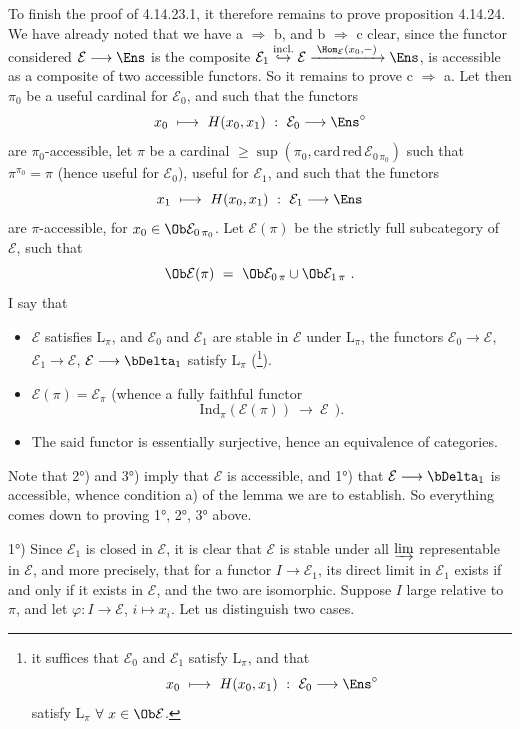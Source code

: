 To finish the proof of 4.14.23.1, it therefore remains to prove proposition 4.14.24. We have already noted that we have a $\Longrightarrow$ b, and b $\Longrightarrow$ c clear, since the functor considered $\mathcal{E}\longrightarrow\Ens$ is the composite $\mathcal{E}_1\overset{\text{incl.}}{\hookrightarrow}\mathcal{E}\xrightarrow{\;\Hom_{\mathcal{E}}(x_0,-)\;}\Ens$, is accessible as a composite of two
accessible functors. So it remains to prove c $\Longrightarrow$ a. Let then $\pi_0$ be a useful cardinal for $\mathcal{E}_0$, and such that the functors
\[
x_0\ \longmapsto\ H(x_0,x_1)\ :\ \mathcal{E}_0\longrightarrow\Ens^{\circ}
\]
are $\pi_0$-accessible, let $\pi$ be a cardinal $\geqslant\sup(\pi_0,\mathrm{card}\,\text{red}\,\mathcal{E}_{0\,\pi_0})$ such that $\pi^{\pi_0}=\pi$ (hence useful for $\mathcal{E}_0$), useful for $\mathcal{E}_1$, and such that the functors
\[
x_1\ \longmapsto\ H(x_0,x_1)\ :\ \mathcal{E}_1\longrightarrow\Ens
\]
are $\pi$-accessible, for $x_0\in\Ob\mathcal{E}_{0\,\pi_0}$. Let $\mathcal{E}(\pi)$ be the strictly full subcategory of $\mathcal{E}$, such that
\[
\Ob\mathcal{E}(\pi)\ =\ \Ob\mathcal{E}_{0\,\pi}\cup\Ob\mathcal{E}_{1\,\pi}\ .
\]
I say that
\begin{itemize}[leftmargin=*]
\item[1°)] $\mathcal{E}$ satisfies $\mathrm{L}_\pi$, and $\mathcal{E}_0$ and $\mathcal{E}_1$ are stable in $\mathcal{E}$ under $\mathrm{L}_\pi$, the functors $\mathcal{E}_0\longrightarrow\mathcal{E}$, $\mathcal{E}_1\longrightarrow\mathcal{E}$, $\mathcal{E}\longrightarrow\bDelta_1$ satisfy $\mathrm{L}_\pi$ (\footnote[174]{it suffices that $\mathcal{E}_0$ and $\mathcal{E}_1$ satisfy $\mathrm{L}_\pi$, and that
\[
x_0\ \longmapsto\ H(x_0,x_1)\ :\ \mathcal{E}_0\longrightarrow\Ens^{\circ}
\]
satisfy $\mathrm{L}_\pi$ $\forall\ x\in\Ob\mathcal{E}$.}).
\item[2°)] $\mathcal{E}(\pi)=\mathcal{E}_\pi$ (whence a fully faithful functor
\[
\mathrm{Ind}_\pi(\mathcal{E}(\pi))\ \longrightarrow\ \mathcal{E}\ \ ).
\]
\item[3°)] The said functor is essentially surjective,
hence an equivalence of categories.
\end{itemize}
Note that 2°) and 3°) imply that $\mathcal{E}$ is accessible, and 1°) that $\mathcal{E}\longrightarrow\bDelta_1$ is accessible, whence condition a) of the lemma we are to establish. So everything comes down to proving 1°, 2°, 3° above.

1°) Since $\mathcal{E}_1$ is closed in $\mathcal{E}$, it is clear that $\mathcal{E}$ is stable under all $\varinjlim$ representable in $\mathcal{E}$, and more precisely, that for a functor $I\longrightarrow\mathcal{E}_1$, its direct limit in $\mathcal{E}_1$ exists if and only if it exists in $\mathcal{E}$, and the two are isomorphic. Suppose $I$ large relative to $\pi$, and let $\varphi:I\longrightarrow\mathcal{E}$, $i\longmapsto x_i$. Let us distinguish two cases.

